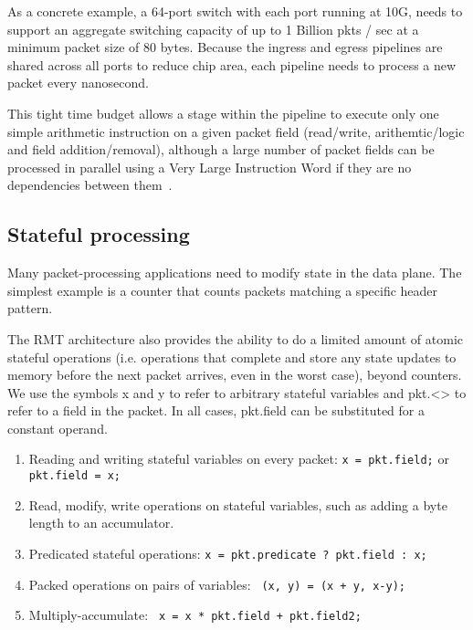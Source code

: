 As a concrete example, a 64-port switch with each port running at 10G, needs to
support an aggregate switching capacity of up to 1 Billion pkts / sec at a
minimum packet size of 80 bytes. Because the ingress and egress pipelines are
shared across all ports to reduce chip area, each pipeline needs to process a
new packet every nanosecond.

This tight time budget allows a stage within the pipeline to execute only one
simple arithmetic instruction on a given packet field (read/write,
arithemtic/logic and field addition/removal), although a large number of packet
fields can be processed in parallel using a Very Large Instruction Word if they
are no dependencies between them~\cite{rmt}.

\subsection{Stateful processing}
Many packet-processing applications need to modify state in the data plane. The
simplest example is a counter that counts packets matching a specific header
pattern.

The RMT architecture also provides the ability to do a limited amount of atomic
stateful operations (i.e. operations that complete and store any state updates to
memory before the next packet arrives, even in the worst case), beyond counters.
We use the symbols x and y to refer to
arbitrary stateful variables and pkt.<> to refer to a field in the packet. In
all cases, pkt.field can be substituted for a constant operand.
\begin{enumerate}
\item Reading and writing stateful variables on every packet:
      \texttt{x = pkt.field;} or \texttt{pkt.field = x;}
\item Read, modify, write operations on stateful variables, such as adding a byte
      length to an accumulator.
\item Predicated stateful operations: \texttt{x = pkt.predicate ? pkt.field : x;}
\item Packed operations on pairs of variables: \texttt{ (x, y) = (x + y, x-y);}
\item Multiply-accumulate: \texttt{ x = x * pkt.field + pkt.field2; }
\end{enumerate}

